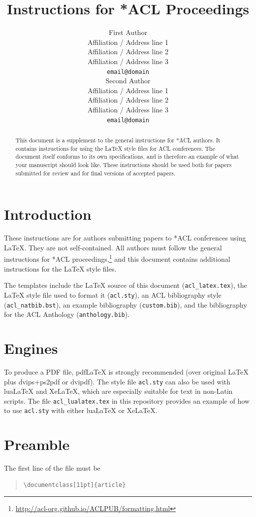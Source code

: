 \documentclass[11pt]{article}
\title{Instructions for *ACL Proceedings}
\author{First Author \\
  Affiliation / Address line 1 \\
  Affiliation / Address line 2 \\
  Affiliation / Address line 3 \\
  \texttt{email@domain} \\\And
  Second Author \\
  Affiliation / Address line 1 \\
  Affiliation / Address line 2 \\
  Affiliation / Address line 3 \\
  \texttt{email@domain} \\}
\begin{document}
\maketitle
\begin{abstract}
This document is a supplement to the general instructions for *ACL authors. It contains instructions for using the \LaTeX{} style files for ACL conferences.
The document itself conforms to its own specifications, and is therefore an example of what your manuscript should look like.
These instructions should be used both for papers submitted for review and for final versions of accepted papers.
\end{abstract}

\section{Introduction}

These instructions are for authors submitting papers to *ACL conferences using \LaTeX. They are not self-contained. All authors must follow the general instructions for *ACL proceedings,\footnote{\url{http://acl-org.github.io/ACLPUB/formatting.html}} and this document contains additional instructions for the \LaTeX{} style files.

The templates include the \LaTeX{} source of this document (\texttt{acl\_latex.tex}),
the \LaTeX{} style file used to format it (\texttt{acl.sty}),
an ACL bibliography style (\texttt{acl\_natbib.bst}),
an example bibliography (\texttt{custom.bib}),
and the bibliography for the ACL Anthology (\texttt{anthology.bib}).

\section{Engines}

To produce a PDF file, pdf\LaTeX{} is strongly recommended (over original \LaTeX{} plus dvips+ps2pdf or dvipdf).
The style file \texttt{acl.sty} can also be used with
lua\LaTeX{} and
Xe\LaTeX{}, which are especially suitable for text in non-Latin scripts.
The file \texttt{acl\_lualatex.tex} in this repository provides
an example of how to use \texttt{acl.sty} with either
lua\LaTeX{} or
Xe\LaTeX{}.

\section{Preamble}

The first line of the file must be
\begin{quote}
\begin{verbatim}
\documentclass[11pt]{article}
\end{verbatim}
\end{quote}
\end{document}
